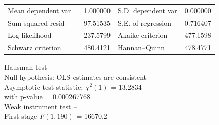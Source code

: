 \documentclass[11pt]{article}
\begin{document}
\begin{appendices}
\begin{table}[H]
\begin{center}
	\vspace{1ex}
	\begin{tabular}{lrlr}
		Mean dependent var &  1.000000 & S.D. dependent var &  0.000000 \\
		Sum squared resid &  97.51535 & S.E. of regression &  0.716407 \\
		Log-likelihood & $-$237.5799 & Akaike criterion &  477.1598 \\
		Schwarz criterion &  480.4121 & Hannan--Quinn &  478.4771 \\
	\end{tabular}

	\vspace{1em}
	\begin{raggedright}
		Hausman test --\\
		\quad Null hypothesis: OLS estimates are consistent\\
		\quad Asymptotic test statistic: $\chi^2(1)$ = 13.2834\\
		\quad with p-value = 0.000267768\\
	\vspace{1ex}
		Weak instrument test -- \\
		\quad First-stage $F(1, 190)$ = 16670.2 \\
	\end{raggedright}

	\end{center}
	\label{tab:18}
\end{table}


\end{appendices}
\end{document}

